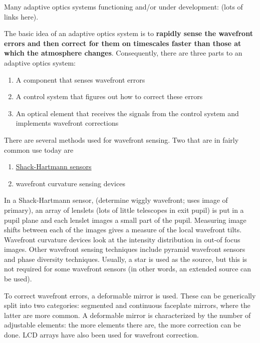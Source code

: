 \documentclass[12pt]{article}
\newcommand{\mynotes}[1]{\textcolor{myBlue}{#1}}
\begin{document}
Many adaptive optics systems functioning and/or under development:
(lots of links here).

The basic idea of an adaptive optics system is to \textbf{rapidly sense the
wavefront errors and then correct for them on timescales faster
than those at which the atmosphere changes}. Consequently, there are
three parts to an adaptive optics system:
\begin{enumerate}
    \item A component that senses wavefront errors
    \item A control system that figures out how to correct these errors
    \item An optical element that receives the signals from the
        control system and implements wavefront corrections
\end{enumerate}
There are several methods used for wavefront sensing. Two that are in
fairly common use today are
\begin{enumerate}
    \item \href{http://astronomy.nmsu.edu/holtz/a535/html/diagrams/a535/beckers3.htm}
        {Shack-Hartmann sensors}
    \item wavefront curvature sensing devices
\end{enumerate}
In a Shack-Hartmann sensor,
\mynotes{(determine wiggly wavefront; uses image of primary)}, an array of
lenslets \mynotes{(lots of little telescopes in exit pupil)}
is put in a pupil plane and each lenslet images a small part of the pupil.
Measuring image shifts between each of the images gives a measure of the local
wavefront tilts. Wavefront curvature devices look at the intensity distribution
in out-of focus images. Other wavefront sensing techniques include pyramid
wavefront sensors and phase diversity techniques. Usually, a star is used as
the source, but this is not required for some wavefront sensors (in other
words, an extended source can be used).

To correct wavefront errors, a deformable mirror is used. These can be
generically split into two categories: segmented and continuous faceplate
mirrors, where the latter are more common. A deformable mirror is
characterized by the number of adjustable elements: the more elements there
are, the more correction can be done. LCD arrays have also been used for
wavefront correction.
\end{document}
